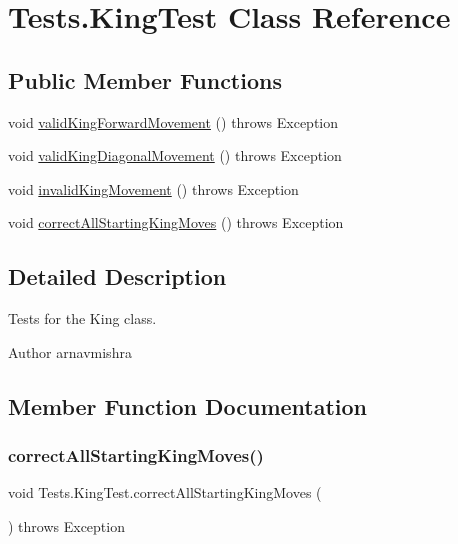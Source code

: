 \hypertarget{class_tests_1_1_king_test}{}\section{Tests.\+King\+Test Class Reference}
\label{class_tests_1_1_king_test}
\subsection*{Public Member Functions}
\begin{DoxyCompactItemize}
\item 
void \hyperlink{class_tests_1_1_king_test_ae1c17c791c61a55e41358e79d65efb6a}{valid\+King\+Forward\+Movement} ()  throws Exception 
\item 
void \hyperlink{class_tests_1_1_king_test_a297113688dc835173504e520e6e1f8e5}{valid\+King\+Diagonal\+Movement} ()  throws Exception 
\item 
void \hyperlink{class_tests_1_1_king_test_a9f87b45c5ea04ab26343e828ffac02f6}{invalid\+King\+Movement} ()  throws Exception 
\item 
void \hyperlink{class_tests_1_1_king_test_a6ebd4a43cfa189c1f572ee5978d47330}{correct\+All\+Starting\+King\+Moves} ()  throws Exception 
\end{DoxyCompactItemize}


\subsection{Detailed Description}
Tests for the King class. \begin{DoxyAuthor}{Author}
arnavmishra 
\end{DoxyAuthor}


\subsection{Member Function Documentation}
\hypertarget{class_tests_1_1_king_test_a6ebd4a43cfa189c1f572ee5978d47330}{}\label{class_tests_1_1_king_test_a6ebd4a43cfa189c1f572ee5978d47330} 
\subsubsection{\texorpdfstring{correct\+All\+Starting\+King\+Moves()}{correctAllStartingKingMoves()}}
{\footnotesize\ttfamily void Tests.\+King\+Test.\+correct\+All\+Starting\+King\+Moves (\begin{DoxyParamCaption}{ }\end{DoxyParamCaption}) throws Exception}

